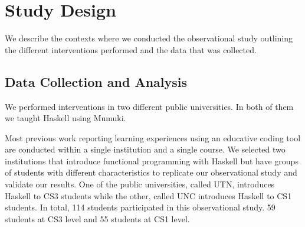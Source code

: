 \section{Study Design} \label{study-design}



We describe the contexts where we conducted the observational study outlining the different interventions performed and the data that was collected. 

\subsection{Data Collection and Analysis}

We performed interventions in two different public universities. In both of them we taught Haskell using Mumuki. %

Most previous work reporting learning experiences using an educative coding tool are conducted within a single institution and a single course. We selected two institutions that introduce functional programming with Haskell but have groups of students with different characteristics to replicate our observational study and validate our results. One of the public universities, called UTN, introduces Haskell to CS3 students while the other, called UNC introduces Haskell to CS1 students. In total, 114 students participated in this observational study. 59 students at CS3 level and 55 students at CS1 level.



